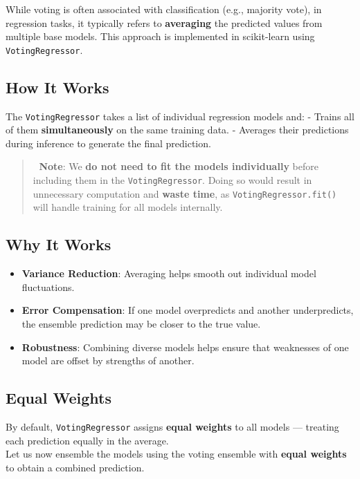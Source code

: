 \documentclass[
  letterpaper,
  DIV=11,
  numbers=noendperiod]{scrreprt}
\providecommand{\tightlist}{%
  \setlength{\itemsep}{0pt}\setlength{\parskip}{0pt}}\usepackage{longtable,booktabs,array}
\begin{document}
While voting is often associated with classification (e.g., majority
vote), in regression tasks, it typically refers to \textbf{averaging}
the predicted values from multiple base models. This approach is
implemented in scikit-learn using \texttt{VotingRegressor}.

\subsection{How It Works}\label{how-it-works-1}

The \texttt{VotingRegressor} takes a list of individual regression
models and: - Trains all of them \textbf{simultaneously} on the same
training data. - Averages their predictions during inference to generate
the final prediction.

\begin{quote}
📌 \textbf{Note}: We \textbf{do not need to fit the models individually}
before including them in the \texttt{VotingRegressor}. Doing so would
result in unnecessary computation and \textbf{waste time}, as
\texttt{VotingRegressor.fit()} will handle training for all models
internally.
\end{quote}

\subsection{Why It Works}\label{why-it-works}

\begin{itemize}
\tightlist
\item
  \textbf{Variance Reduction}: Averaging helps smooth out individual
  model fluctuations.
\item
  \textbf{Error Compensation}: If one model overpredicts and another
  underpredicts, the ensemble prediction may be closer to the true
  value.
\item
  \textbf{Robustness}: Combining diverse models helps ensure that
  weaknesses of one model are offset by strengths of another.
\end{itemize}

\subsection{Equal Weights}\label{equal-weights}

By default, \texttt{VotingRegressor} assigns \textbf{equal weights} to
all models --- treating each prediction equally in the average.\\
Let us now ensemble the models using the voting ensemble with
\textbf{equal weights} to obtain a combined prediction.
\end{document}
